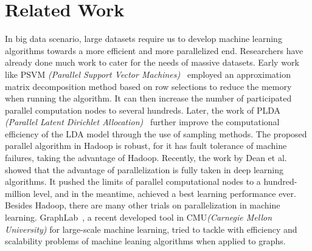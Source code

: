 \documentclass{llncs}
\begin{document}
\section{Related Work} \label{sec:rew}
In big data scenario, large datasets require us to develop machine learning algorithms towards a more efficient and more parallelized end.
Researchers have already done much work to cater for the needs of massive datasets.
Early work like PSVM \textit{(Parallel Support Vector Machines)}~\cite{chang2011psvm} employed an approximation matrix decomposition method based on row selections to reduce the memory when running the algorithm.
It can then increase the number of participated parallel computation nodes to several hundreds.
Later, the work of PLDA \textit{(Parallel Latent Dirichlet Allocation)}~\cite{wang2009plda} further improve the computational efficiency of the LDA model through the use of sampling methods.
The proposed parallel algorithm in Hadoop is robust, for it has fault tolerance of machine failures, taking the advantage of Hadoop.
Recently, the work by Dean et al.\cite{le2011building} showed that the advantage of parallelization is fully taken in deep learning algorithms.
It pushed the limits of parallel computational nodes to a hundred-million level, and in the meantime, achieved a best learning performance ever.
Besides Hadoop, there are many other trials on parallelization in machine learning.
GraphLab~\cite{kyrola2012graphchi}, a recent developed tool in CMU\textit{(Carnegie Mellon University)} for large-scale machine learning, tried to tackle with efficiency and scalability problems of machine leaning algorithms when applied to graphs.
\end{document}
